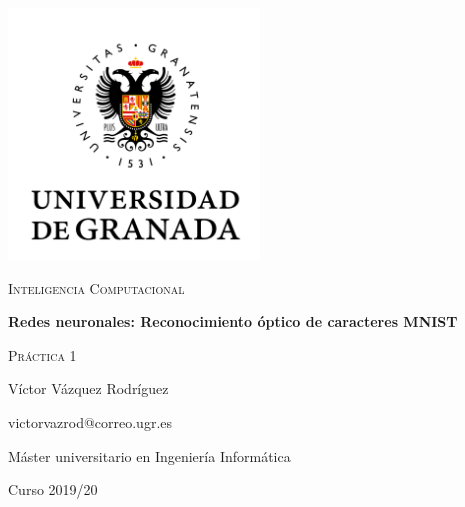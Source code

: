 \documentclass{article}
\begin{document}
\begin{titlepage}
    \centering
    \includegraphics[width=0.5\textwidth]{images/logo-ugr.png}\par
    \vspace{1cm}
    {\Large\scshape Inteligencia Computacional \par}
    {\huge\bfseries Redes neuronales: Reconocimiento óptico de caracteres MNIST
    \par}
    \vspace{0.2cm}
    {\scshape Práctica 1 \par}
    \vfill
    {\large Víctor Vázquez Rodríguez  \par}
    {victorvazrod@correo.ugr.es \par}
    \vfill
    {\large Máster universitario en Ingeniería Informática \par}
    \vspace{0.2cm}
    {Curso 2019/20 \par}
\end{titlepage}

\tableofcontents\newpage

\newpage
\newpage
\newpage
\end{document}
